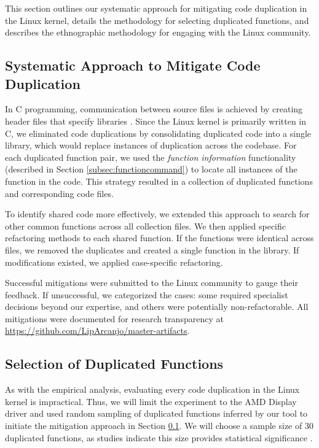 This section outlines our systematic approach for mitigating code duplication in the Linux kernel, details the methodology for selecting duplicated functions, and describes the ethnographic methodology for engaging with the Linux community.

\subsection{Systematic Approach to Mitigate Code Duplication}
\label{subsec:pipeline}

In C programming, communication between source files is achieved by creating header files that specify libraries \citep{Cbook}. Since the Linux kernel is primarily written in C, we eliminated code duplications by consolidating duplicated code into a single library, which would replace instances of duplication across the codebase.
%
For each duplicated function pair, we used the \textit{function information} functionality (described in Section \ref{subsec:functioncommand}) to locate all instances of the function in the code. This strategy resulted in a collection of duplicated functions and corresponding code files.

To identify shared code more effectively, we extended this approach to search for other common functions across all collection files. We then applied specific refactoring methods to each shared function. If the functions were identical across files, we removed the duplicates and created a single function in the library. If modifications existed, we applied case-specific refactoring.

Successful mitigations were submitted to the Linux community to gauge their feedback. If unsuccessful, we categorized the cases: some required specialist decisions beyond our expertise, and others were potentially non-refactorable. All mitigations were documented for research transparency at \url{https://github.com/LipArcanjo/master-artifacts}.

\subsection{Selection of Duplicated Functions}

As with the empirical analysis, evaluating every code duplication in the Linux kernel is impractical. 
Thus, we will limit the experiment to the AMD Display driver and used random sampling of duplicated functions
inferred by our tool to initiate the mitigation approach in Section \ref{subsec:pipeline}. 
We will choose a sample size of 30 duplicated functions, as studies indicate this size provides 
statistical significance \citep{sample1, sample2}.

